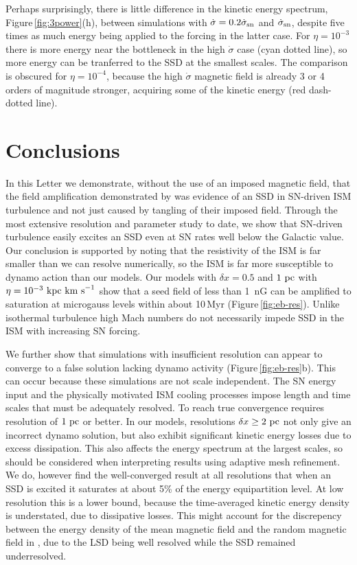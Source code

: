 \documentclass[preprint2]{aastex63}
\newcommand\SNr{\dot\sigma_{\rm sn}}
\newcommand\kpc{~ {\rm kpc}}
\newcommand\pc{~ {\rm pc}}
\newcommand\dx{ {\delta x}}
\newcommand\kms{~ {\rm km~ s}^{-1}}
\begin{document}
 Perhaps surprisingly, there is little difference in the kinetic energy
 spectrum, Figure\,\ref{fig:3power}(h), between simulations with
 $\dot\sigma=0.2\SNr$ and $\SNr$, despite five times as much energy being
 applied to the forcing in the latter case.
 For $\eta=10^{-3}$ there is more energy near the bottleneck in the high
 $\dot\sigma$ case (cyan dotted line), so more energy can be tranferred to
 the SSD at the smallest scales.
 The comparison is obscured for $\eta=10^{-4}$, because the high $\dot\sigma$
 magnetic field is already 3 or 4 orders of magnitude stronger, acquiring some
 of the kinetic energy (red dash-dotted line).

\section{Conclusions}\label{sec:conc}

In this Letter we demonstrate, without the use of an imposed magnetic field, that
the field amplification demonstrated by \citet{BKMM04} was evidence of
an SSD in SN-driven ISM turbulence and not just caused by tangling of their imposed field.
Through the most extensive resolution and parameter study to date, we show
that SN-driven turbulence easily excites an SSD even at SN rates well below the
Galactic value.
Our conclusion is supported by noting that the resistivity of the ISM is far
smaller than we can resolve numerically, so the ISM is far more susceptible to
dynamo action than our models.
Our models with $\dx=0.5$ and $1\pc$ with $\eta=10^{-3}\kpc\kms$ show that a seed field of less than 1~nG can be
amplified to saturation at microgauss levels within about 10\,Myr
(Figure\,\ref{fig:eb-res}). 
Unlike isothermal turbulence high Mach numbers do not necessarily impede SSD
in the ISM with increasing SN forcing.

We further show that simulations with insufficient resolution can appear to
converge to a false solution lacking dynamo activity
(Figure\,\ref{fig:eb-res}b). This can occur because these simulations
are not scale independent. 
The SN energy input and the physically motivated ISM cooling processes impose
length and time scales that must be adequately resolved.
To reach true convergence requires resolution of $1\pc$ or better.
In our models, resolutions $\dx\geq2\pc$ not only give an incorrect dynamo
solution, but also exhibit significant kinetic energy losses due to excess
dissipation.
This also affects the energy spectrum at the largest scales, so should be 
considered when interpreting results using adaptive mesh refinement.
We do, however find
     the well-converged result at all resolutions
that when an SSD is excited it saturates at about 5\% of the energy equipartition level.
At low resolution this is a lower bound, because the time-averaged kinetic
energy density is understated, due to dissipative losses.
This might account for the discrepency between the energy density of the mean
magnetic field and the random magnetic field in \citet{Gent:2013b}, due to the
LSD being well resolved while the SSD remained underresolved.
\end{document}
